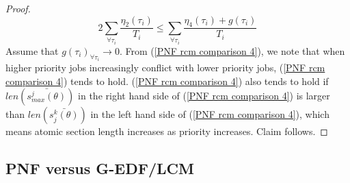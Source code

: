 \documentclass[a4paper,english]{article}
\newtheorem{proof}{Proof}
\begin{document}
\begin{proof}
%
\begin{equation}
2\sum_{\forall\tau_{i}}\frac{\eta_{2}(\tau_{i})}{T_{i}}\le\sum_{\forall\tau_{i}}\frac{\eta_{4}(\tau_{i})+g(\tau_{i})}{T_{i}}
\label{PNF rcm comparison 4}
\end{equation}
%
Assume that $g(\tau_{i})_{\forall\tau_{i}}\rightarrow0$. From (\ref{PNF rcm comparison 4}), we note that when higher priority jobs increasingly conflict with lower priority jobs, (\ref{PNF rcm comparison 4}) tends to hold. (\ref{PNF rcm comparison 4}) also tends to hold if $len(\bar{s_{max}^j(\theta)})$ in the right hand side of (\ref{PNF rcm comparison 4}) is larger than $len(\bar{s_j^k(\theta)})$ in the left hand side of (\ref{PNF rcm comparison 4}), which means atomic section length increases as priority increases. Claim follows.
\end{proof}

\subsection{PNF versus G-EDF/LCM}
\end{document}
